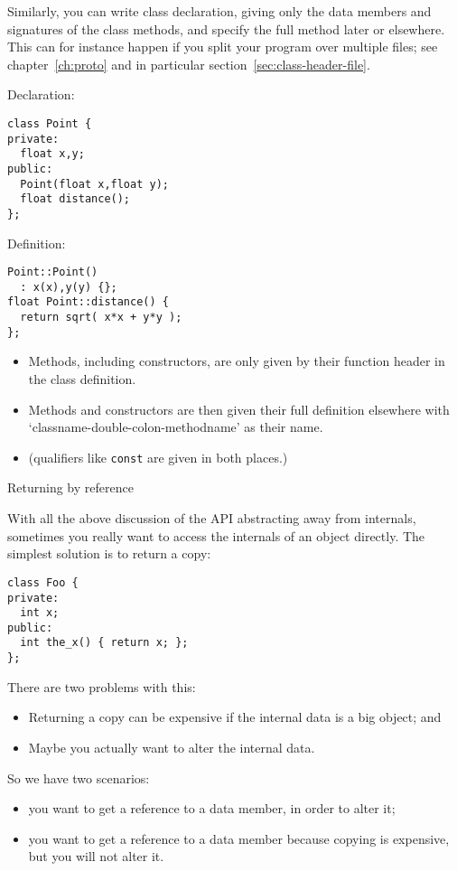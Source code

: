 Similarly, you can write class declaration, giving only the
data members and signatures of the class methods,
and specify the full method later or elsewhere.
This can for instance happen if you split your program over multiple files;
see chapter~\ref{ch:proto} and in particular section~\ref{sec:class-header-file}.

\begin{multicols}{2}
  Declaration:
\begin{lstlisting}
class Point {
private:
  float x,y;
public:
  Point(float x,float y);
  float distance();
};
\end{lstlisting}
\columnbreak
Definition:
\begin{lstlisting}
Point::Point()
  : x(x),y(y) {};
float Point::distance() {
  return sqrt( x*x + y*y );
};
\end{lstlisting}
\end{multicols}
\begin{itemize}
\item Methods, including constructors, are only given by their function header
  in the class definition.
\item Methods and constructors are then given their full definition elsewhere
  with
  `classname-double-colon-methodname' as their name.
\item (qualifiers like \lstinline{const} are given in both places.)
\end{itemize}

 {Returning by reference}


With all the above discussion of the \ac{API} abstracting away from internals,
sometimes you really want to access the internals of an object directly.
The simplest solution is to return a copy:
\begin{lstlisting}
class Foo {
private:
  int x;
public:
  int the_x() { return x; };
};
\end{lstlisting}
There are two problems with this:
\begin{itemize}
\item
  Returning a copy can be expensive if the internal data is a big object; and
\item 
  Maybe you actually want to alter the internal data.
\end{itemize}

So we have two scenarios:
\begin{itemize}
\item you want to get a reference to a data member, in order to alter it;
\item you want to get a reference to a data member because copying is expensive,
  but you will not alter it.
\end{itemize}

